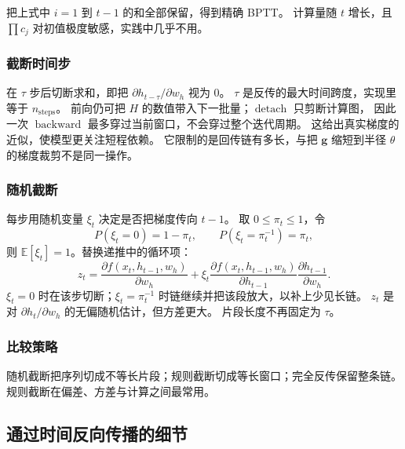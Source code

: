 把上式中 $i=1$ 到 $t-1$ 的和全部保留，得到精确 BPTT。
计算量随 $t$ 增长，且 $\prod c_j$ 对初值极度敏感，实践中几乎不用。

\subsubsection{截断时间步}

在 $\tau$ 步后切断求和，即把 $\partial h_{t-\tau}/\partial w_h$ 视为 $0$。
$\tau$ 是反传的最大时间跨度，实现里等于 $n_{\mathrm{steps}}$。
前向仍可把 $H$ 的数值带入下一批量；$\operatorname{detach}$ 只剪断计算图，
因此一次 $\operatorname{backward}$ 最多穿过当前窗口，不会穿过整个迭代周期。
这给出真实梯度的近似，使模型更关注短程依赖。
它限制的是回传链有多长，与把 $\bm{g}$ 缩短到半径 $\theta$ 的梯度裁剪不是同一操作。

\subsubsection{随机截断}

每步用随机变量 $\xi_t$ 决定是否把梯度传向 $t-1$。
取 $0\le\pi_t\le 1$，令
\[
P(\xi_t=0)=1-\pi_t,
\qquad
P(\xi_t=\pi_t^{-1})=\pi_t,
\]
则 $\mathbb{E}[\xi_t]=1$。替换递推中的循环项：
\[
z_t
=
\frac{\partial f(x_t,h_{t-1},w_h)}{\partial w_h}
+
\xi_t
\frac{\partial f(x_t,h_{t-1},w_h)}{\partial h_{t-1}}
\frac{\partial h_{t-1}}{\partial w_h}.
\]
$\xi_t=0$ 时在该步切断；$\xi_t=\pi_t^{-1}$ 时链继续并把该段放大，以补上少见长链。
$z_t$ 是对 $\partial h_t/\partial w_h$ 的无偏随机估计，但方差更大。
片段长度不再固定为 $\tau$。

\subsubsection{比较策略}

随机截断把序列切成不等长片段；规则截断切成等长窗口；完全反传保留整条链。
规则截断在偏差、方差与计算之间最常用。

\subsection{通过时间反向传播的细节}

